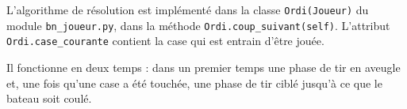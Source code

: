 L'algorithme de résolution est implémenté dans la classe \texttt{Ordi(Joueur)} du module \texttt{bn\_joueur.py}, dans la méthode \texttt{Ordi.coup\_suivant(self)}. L'attribut \texttt{Ordi.case\_courante} contient la case qui est entrain d'être jouée.

Il fonctionne en deux temps : dans un premier temps une phase de tir en aveugle et, une fois qu'une case a été touchée, une phase de tir ciblé jusqu'à ce que le bateau soit coulé.

